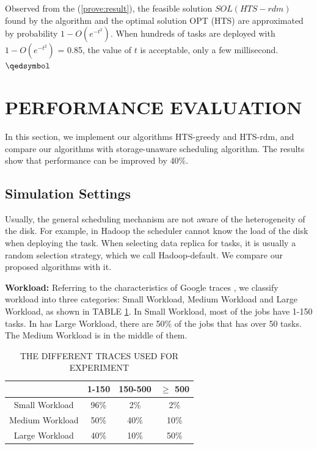 \documentclass[conference]{IEEEtran}
\begin{document}
Observed from the (\ref{prove:result}), the feasible solution $SOL(HTS-rdm)$ found by the algorithm and the optimal solution OPT (HTS) are approximated by probability $1 - O(e^{-t^2})$. When hundreds of tasks are deployed with $1 - O(e^{-t^2})$ = 0.85, the value of $t$ is acceptable, only a few millisecond.\hfill $\qedsymbol$


\section{PERFORMANCE EVALUATION}\label{PERFORMANCE_EVALUATION}

In this section, we implement our algorithms HTS-greedy and HTS-rdm, and compare our algorithms with storage-unaware scheduling algorithm. The results show that performance can be improved by 40\%.
\subsection{Simulation Settings}\label{SCM}
Usually, the general scheduling mechanism are not aware of the heterogeneity of the disk. For example, in Hadoop the scheduler cannot know the load of the disk when deploying the task. When selecting data replica for tasks, it is usually a random selection strategy, which we call Hadoop-default. We compare our proposed algorithms with it.

\textbf{Workload:} Referring to the characteristics of Google traces \cite{b20}, we classify workload into three categories: Small Workload, Medium Workload and Large Workload, as shown in TABLE \ref{tab:workload}. In Small Workload, most of the jobs have 1-150 tasks. In has Large Workload, there are 50\% of the jobs that has over 50 tasks. The Medium Workload is in the middle of them.

\begin{table}[htbp]
	\caption{THE DIFFERENT TRACES USED FOR EXPERIMENT}
	\begin{center}
		\begin{tabular}{|c|c|c|c|}
			\hline
			 \diagbox{Traces}{Number of tasks} & 1-150 & 150-500 & $\ge$ 500\\
			\hline
			Small Workload & 96\% & 2\% & 2\%\\
			\hline
			Medium Workload & 50\% & 40\% & 10\%\\
			\hline
			Large Workload & 40\% & 10\% & 50\%\\
			\hline
		\end{tabular}
		\label{tab:workload}
	\end{center}
\end{table}
\end{document}
